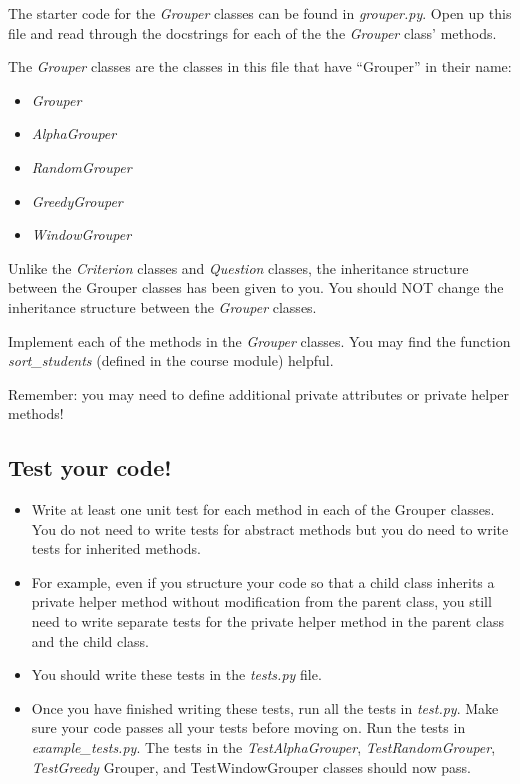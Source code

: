 \documentclass[12pt]{article}
\begin{document}
\bigskip

\noindent The starter code for the \textit{Grouper} classes can be found in
\textit{grouper.py}. Open up this file and read through the docstrings for each
of the the \textit{Grouper} class’ methods.

\bigskip

\noindent The \textit{Grouper} classes are the classes in this file that have
“Grouper” in their name:

\begin{itemize}
    \item \textit{Grouper}
    \item \textit{AlphaGrouper}
    \item \textit{RandomGrouper}
    \item \textit{GreedyGrouper}
    \item \textit{WindowGrouper}
\end{itemize}

\noindent Unlike the \textit{Criterion} classes and \textit{Question} classes, the
inheritance structure between the Grouper classes has been given to you. You
should NOT change the inheritance structure between the \textit{Grouper} classes.

\bigskip

\noindent Implement each of the methods in the \textit{Grouper} classes. You may
find the function \textit{sort\_students} (defined in the course module) helpful.

\bigskip

\noindent Remember: you may need to define additional private attributes or private
helper methods!

\bigskip

\subsection*{Test your code!}
\begin{itemize}
\item Write at least one unit test for each method in each of the Grouper classes. You
do not need to write tests for abstract methods but you do need to write tests
for inherited methods.

\item For example, even if you structure your code so that a child class
inherits a private helper method without modification from the parent class,
you still need to write separate tests for the private helper method in the
parent class and the child class.

\item You should write these tests in the \textit{tests.py} file.
\item Once you have finished writing these tests, run all the tests in
\textit{test.py}. Make sure your code passes all your tests before moving on.
Run the tests in \textit{example\_tests.py}. The tests in the \textit{TestAlphaGrouper},
\textit{TestRandomGrouper}, \textit{TestGreedy} Grouper, and TestWindowGrouper
classes should now pass.

\end{itemize}
\end{document}
